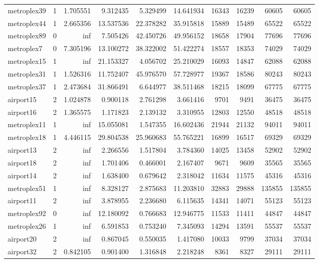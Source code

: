 \begin{longtable}{|l|r|r|r|r|r|r|r|r|r|}
metroplex39 & 1 & 1.705551 & 9.312435 & 5.329499 & 14.641934 & 16343 & 16239 & 60605 & 60605 \\
metroplex44 & 1 & 2.665356 & 13.537536 & 22.378282 & 35.915818 & 15889 & 15489 & 65522 & 65522 \\
metroplex89 & 0 & inf & 7.505426 & 42.450726 & 49.956152 & 18658 & 17904 & 77696 & 77696 \\
metroplex7 & 0 & 7.305196 & 13.100272 & 38.322002 & 51.422274 & 18557 & 18353 & 74029 & 74029 \\
metroplex15 & 1 & inf & 21.153327 & 4.056702 & 25.210029 & 16093 & 14847 & 62088 & 62088 \\
metroplex31 & 1 & 1.526316 & 11.752407 & 45.976570 & 57.728977 & 19367 & 18586 & 80243 & 80243 \\
metroplex37 & 1 & 2.473684 & 31.866491 & 6.644977 & 38.511468 & 18215 & 18099 & 67775 & 67775 \\
airport15 & 2 & 1.024878 & 0.900118 & 2.761298 & 3.661416 & 9701 & 9491 & 36475 & 36475 \\
airport16 & 2 & 1.365575 & 1.171823 & 2.139132 & 3.310955 & 12803 & 12550 & 48518 & 48518 \\
metroplex11 & 1 & inf & 15.055081 & 1.547355 & 16.602436 & 21944 & 21132 & 94011 & 94011 \\
metroplex18 & 1 & 4.446115 & 29.804538 & 25.960683 & 55.765221 & 16899 & 16517 & 69329 & 69329 \\
airport13 & 2 & inf & 2.266556 & 1.517804 & 3.784360 & 14025 & 13458 & 52902 & 52902 \\
airport18 & 2 & inf & 1.701406 & 0.466001 & 2.167407 & 9671 & 9609 & 35565 & 35565 \\
airport14 & 2 & inf & 1.638400 & 0.679642 & 2.318042 & 11634 & 11575 & 45316 & 45316 \\
metroplex51 & 1 & inf & 8.328127 & 2.875683 & 11.203810 & 32883 & 29888 & 135855 & 135855 \\
airport11 & 2 & inf & 3.878955 & 2.236680 & 6.115635 & 14341 & 14071 & 55123 & 55123 \\
metroplex92 & 0 & inf & 12.180092 & 0.766683 & 12.946775 & 11533 & 11411 & 44847 & 44847 \\
metroplex26 & 1 & inf & 6.591853 & 0.753240 & 7.345093 & 14294 & 13591 & 55537 & 55537 \\
airport20 & 2 & inf & 0.867045 & 0.550035 & 1.417080 & 10033 & 9799 & 37034 & 37034 \\
airport32 & 2 & 0.842105 & 0.901400 & 1.316848 & 2.218248 & 8361 & 8327 & 29111 & 29111 \\

\end{longtable}
